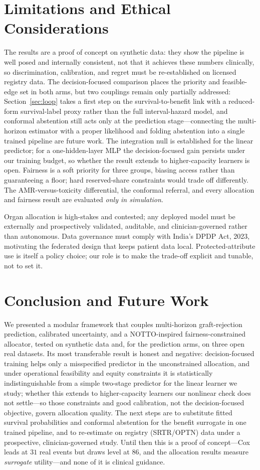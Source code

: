 \documentclass[journal]{IEEEtran}
\begin{document}
\section{Limitations and Ethical Considerations}
The results are a proof of concept on synthetic data: they show the pipeline is well posed and internally consistent, not that it achieves these numbers clinically, so discrimination, calibration, and regret must be re-established on licensed registry data. The decision-focused comparison places the priority and feasible-edge set in both arms, but two couplings remain only partially addressed: Section~\ref{sec:loop} takes a first step on the survival-to-benefit link with a reduced-form survival-label proxy rather than the full interval-hazard model, and conformal abstention still acts only at the prediction stage---connecting the multi-horizon estimator with a proper likelihood and folding abstention into a single trained pipeline are future work. The integration null is established for the linear predictor; for a one-hidden-layer MLP the decision-focused gain persists under our training budget, so whether the result extends to higher-capacity learners is open. Fairness is a soft priority for three groups, biasing access rather than guaranteeing a floor; hard reserved-share constraints would trade off differently. The AMR-versus-toxicity differential, the conformal referral, and every allocation and fairness result are evaluated \emph{only in simulation}.

Organ allocation is high-stakes and contested; any deployed model must be externally and prospectively validated, auditable, and clinician-governed rather than autonomous. Data governance must comply with India's DPDP Act, 2023, motivating the federated design that keeps patient data local. Protected-attribute use is itself a policy choice; our role is to make the trade-off explicit and tunable, not to set it.

\section{Conclusion and Future Work}
We presented a modular framework that couples multi-horizon graft-rejection prediction, calibrated uncertainty, and a NOTTO-inspired fairness-constrained allocator, tested on synthetic data and, for the prediction arms, on three open real datasets. Its most transferable result is honest and negative: decision-focused training helps only a misspecified predictor in the unconstrained allocation, and under operational feasibility and equity constraints it is statistically indistinguishable from a simple two-stage predictor for the linear learner we study; whether this extends to higher-capacity learners our nonlinear check does not settle---so those constraints and good calibration, not the decision-focused objective, govern allocation quality. The next steps are to substitute fitted survival probabilities and conformal abstention for the benefit surrogate in one trained pipeline, and to re-estimate on registry (SRTR/OPTN) data under a prospective, clinician-governed study. Until then this is a proof of concept---Cox leads at $31$ real events but draws level at $86$, and the allocation results measure \emph{surrogate} utility---and none of it is clinical guidance.
\end{document}

